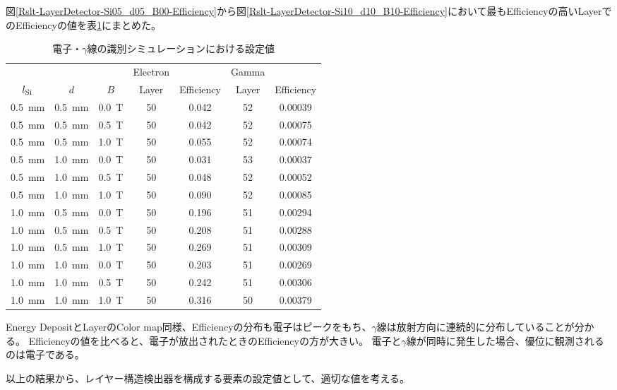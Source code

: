 \documentclass[a4paper,10pt]{jreport}
\begin{document}
図\ref{Rslt-LayerDetector-Si05_d05_B00-Efficiency}から図\ref{Rslt-LayerDetector-Si10_d10_B10-Efficiency}において最もEfficiencyの高いLayerでのEfficiencyの値を表\ref{Tab-Efficiency}にまとめた。

\begin{table}[H] 
	\center
	\caption{電子・$\gamma$線の識別シミュレーションにおける設定値} \label{Tab-Efficiency}
	\begin{tabular}{|ccc|cc|cc|}
		\hline
		 &  &  &  Electron  &  & Gamma  &   \\
		$l_{\rm{Si}}$ & $d$ & $B$ & Layer & Efficiency &  Layer & Efficiency \\
		\hline \hline
		\SI{0.5}{mm} & \SI{0.5}{mm} & \SI{0.0}{T} & 50 & 0.042 & 52 & 0.00039 \\
		\SI{0.5}{mm} & \SI{0.5}{mm} & \SI{0.5}{T} & 50 & 0.042 & 52 & 0.00075 \\
		\SI{0.5}{mm} & \SI{0.5}{mm} & \SI{1.0}{T} & 50 & 0.055 & 52 & 0.00074 \\
		\SI{0.5}{mm} & \SI{1.0}{mm} & \SI{0.0}{T} & 50 & 0.031 & 53 & 0.00037 \\
		\SI{0.5}{mm} & \SI{1.0}{mm} & \SI{0.5}{T} & 50 & 0.048 & 52 & 0.00052 \\
		\SI{0.5}{mm} & \SI{1.0}{mm} & \SI{1.0}{T} & 50 & 0.090 & 52 & 0.00085 \\
		\SI{1.0}{mm} & \SI{0.5}{mm} & \SI{0.0}{T} & 50 & 0.196 & 51 & 0.00294 \\
		\SI{1.0}{mm} & \SI{0.5}{mm} & \SI{0.5}{T} & 50 & 0.208 & 51 & 0.00288 \\
		\SI{1.0}{mm} & \SI{0.5}{mm} & \SI{1.0}{T} & 50 & 0.269 & 51 & 0.00309 \\
		\SI{1.0}{mm} & \SI{1.0}{mm} & \SI{0.0}{T} & 50 & 0.203 & 51 & 0.00269 \\
		\SI{1.0}{mm} & \SI{1.0}{mm} & \SI{0.5}{T} & 50 & 0.242 & 51 & 0.00306 \\
		\SI{1.0}{mm} & \SI{1.0}{mm} & \SI{1.0}{T} & 50 & 0.316 & 50 & 0.00379 \\
		\hline
	\end{tabular}
\end{table}

Energy DepositとLayerのColor map同様、Efficiencyの分布も電子はピークをもち、$\gamma$線は放射方向に連続的に分布していることが分かる。
Efficiencyの値を比べると、電子が放出されたときのEfficiencyの方が大きい。
電子と$\gamma$線が同時に発生した場合、優位に観測されるのは電子である。

以上の結果から、レイヤー構造検出器を構成する要素の設定値として、適切な値を考える。
\end{document}
